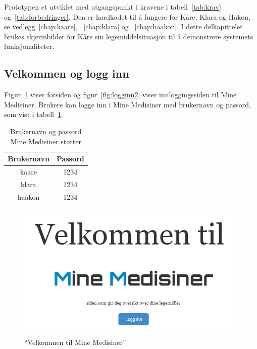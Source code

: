 Prototypen et utviklet med utgangspunkt i kravene i tabell~\ref{tab:krav} og~\ref{tab:forbedringer}. Den er hardkodet til å fungere for Kåre, Klara og Håkon, se vedlegg~\ref{chap:kaare}, ~\ref{chap:klara} og ~\ref{chap:haakon}. I dette delkapittelet brukes skjermbilder for Kåre sin legemiddelsituasjon til å demonstrere systemets funksjonaliteter.

\subsection{Velkommen og logg inn}
Figur~\ref{fig:velkommen} viser forsiden og figur~\ref{fig:logginn2} viser innloggingssiden til Mine Medisiner. Brukere kan logge inn i Mine Medisiner med brukernavn og passord, som vist i tabell~\ref{tab:logginn}.

\begin{table}[H]
    \centering
    \begin{tabular}{|c|c|}
     \hline
     \textbf{Brukernavn} &         \textbf{Passord} \\ \hline
     kaare & 1234 \\  \hline
     klara & 1234  \\  \hline
     haakon & 1234  \\  \hline
     \end{tabular}
    \caption{Brukernavn og passord Mine Medisiner støtter}
    \label{tab:logginn}
\end{table}

\begin{figure}[H]
    \includegraphics[width=\textwidth]{fig/utviklingAvPrototype/velkommen.PNG}
    \caption{“Velkommen til Mine Medisiner”}\label{fig:velkommen}
  \end{figure}

